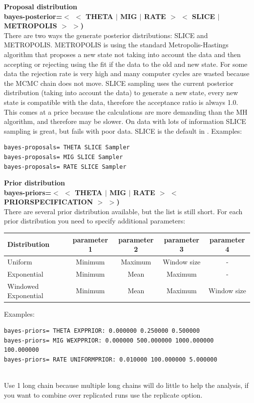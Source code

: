 \begin{description}
\item{\bf Proposal distribution\\
 bayes-posterior=$<$ $<$ THETA $|$ MIG $|$ RATE $>$ $<$ SLICE $|$ METROPOLIS $>$ $>$)}\\
There are two ways the generate posterior distributions: SLICE and METROPOLIS. METROPOLIS is using the standard Metropolis-Hastings algorithm that proposes a new state not taking into account the data and then accepting or rejecting using the fit if the data to the old and new state. For some data the rejection rate is very high and many computer cycles are wasted because the MCMC chain does not move. SLICE sampling uses the current posterior distribution (taking into account the data) to generate a new state, every new state is compatible with the data, therefore the acceptance ratio is always 1.0. This comes at a price because the calculations are more demanding than the MH algorithm, and therefore may be slower. On data with lots of information SLICE sampling is great, but fails with poor data.
SLICE is the default in \migrate.
\vskip 0.5cm
Examples:\begin{small}
\begin{verbatim}
bayes-proposals= THETA SLICE Sampler
bayes-proposals= MIG SLICE Sampler
bayes-proposals= RATE SLICE Sampler
\end{verbatim}
\end{small}

\item{\bf Prior distribution\\
 bayes-priors=$<$ $<$ THETA $|$ MIG $|$ RATE $>$ $<$ PRIORSPECIFICATION $>$ $>$)}\\
There are several prior distribution available, but the list is still short. 
For each prior distribution you need to specify additional parameters:

\begin{tabular}{l c c c c}
Distribution & parameter 1 & parameter 2 & parameter 3 & parameter 4\\
\hline
Uniform & Minimum & Maximum & Window size & -\\
Exponential & Minimum & Mean & Maximum & -\\
Windowed Exponential & Minimum & Mean & Maximum & Window size\\
\hline
\end{tabular}
\vskip 0.5cm
Examples:\begin{small}
\vskip -0.5cm
\begin{verbatim}
bayes-priors= THETA EXPPRIOR: 0.000000 0.250000 0.500000 
bayes-priors= MIG WEXPPRIOR: 0.000000 500.000000 1000.000000 100.000000 
bayes-priors= RATE UNIFORMPRIOR: 0.010000 100.000000 5.000000 
\end{verbatim}
\end{small}
\item{}\\
Use 1 long chain because multiple long chains will do little to help the analysis, if you want to combine over replicated runs use the replicate option.


\end{description}
